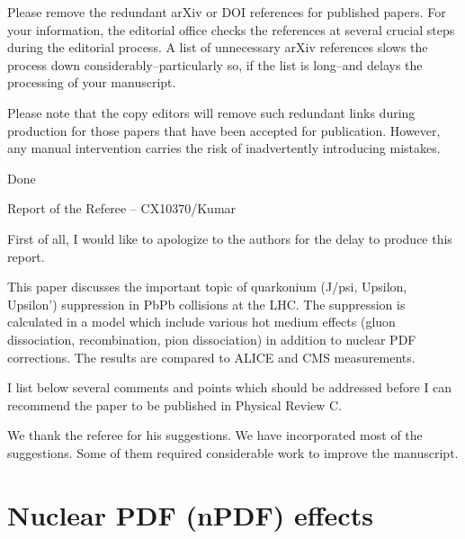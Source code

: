 \documentclass[aps,prc,preprint,superscriptaddress,showpacs,showkeys]{revtex4-1}
\begin{document}
Please remove the redundant arXiv or DOI references for published
papers. For your information, the editorial office checks
the references at several crucial steps during the editorial
process. A list of unnecessary arXiv references slows the process
down considerably--particularly so, if the list is long--and delays
the processing of your manuscript.

Please note that the copy editors will remove such redundant links
during production for those papers that have been accepted for
publication. However, any manual intervention carries the risk of
inadvertently introducing mistakes.

{\color{blue} Done}



\newpage


{\Large Report of the Referee -- CX10370/Kumar}
\bigskip
\bigskip
\bigskip
\bigskip

{\color{red} First of all, I would like to apologize to the authors for the delay
to produce this report.

This paper discusses the important topic of quarkonium (J/psi,
Upsilon, Upsilon') suppression in PbPb collisions at the LHC. The
suppression is calculated in a model which include various hot medium
effects (gluon dissociation, recombination, pion dissociation) in
addition to nuclear PDF corrections. The results are compared to ALICE
and CMS measurements.

I list below several comments and points which should be addressed
before I can recommend the paper to be published in Physical Review C.}

{\color{blue} We thank the referee for his suggestions. We have incorporated most 
of the suggestions. Some of them required considerable work to improve the manuscript. }


\section{Nuclear PDF (nPDF) effects}
\end{document}
